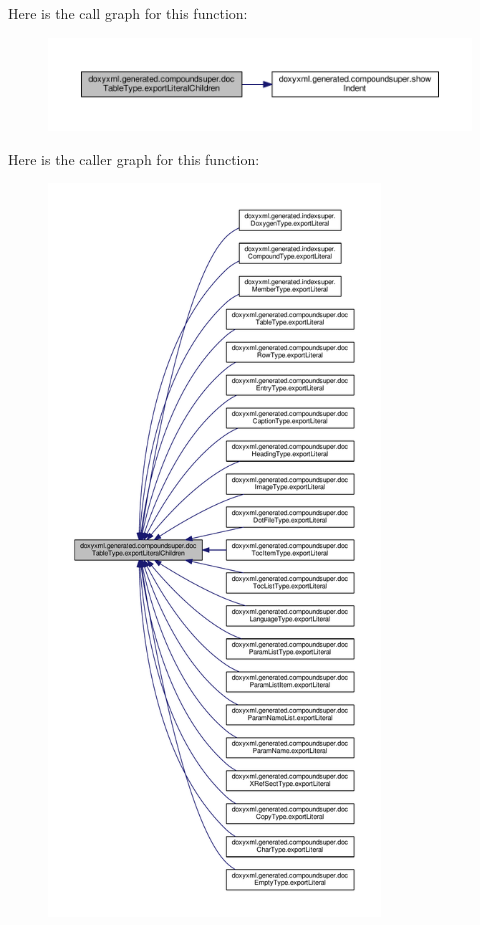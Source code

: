 Here is the call graph for this function\+:
\nopagebreak
\begin{figure}[H]
\begin{center}
\leavevmode
\includegraphics[width=350pt]{d9/d0e/classdoxyxml_1_1generated_1_1compoundsuper_1_1docTableType_a1e20b443cdf7bd82c794c7b1b65276e7_cgraph}
\end{center}
\end{figure}




Here is the caller graph for this function\+:
\nopagebreak
\begin{figure}[H]
\begin{center}
\leavevmode
\includegraphics[height=550pt]{d9/d0e/classdoxyxml_1_1generated_1_1compoundsuper_1_1docTableType_a1e20b443cdf7bd82c794c7b1b65276e7_icgraph}
\end{center}
\end{figure}


